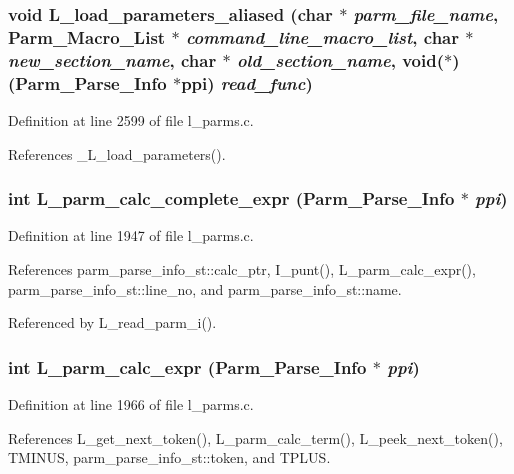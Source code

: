 \subsubsection{\setlength{\rightskip}{0pt plus 5cm}void L\_\-load\_\-parameters\_\-aliased (char $\ast$ {\em parm\_\-file\_\-name}, \bf{Parm\_\-Macro\_\-List} $\ast$ {\em command\_\-line\_\-macro\_\-list}, char $\ast$ {\em new\_\-section\_\-name}, char $\ast$ {\em old\_\-section\_\-name}, void($\ast$)(\bf{Parm\_\-Parse\_\-Info} $\ast$ppi) {\em read\_\-func})}\label{l__parms_8c_bcb88cfb83d54c9c10936af2ca0c6155}




Definition at line 2599 of file l\_\-parms.c.

References \_\-L\_\-load\_\-parameters().
\subsubsection{\setlength{\rightskip}{0pt plus 5cm}int L\_\-parm\_\-calc\_\-complete\_\-expr (\bf{Parm\_\-Parse\_\-Info} $\ast$ {\em ppi})}\label{l__parms_8c_62df370fac8e8f6cd66971ce843bab9c}




Definition at line 1947 of file l\_\-parms.c.

References parm\_\-parse\_\-info\_\-st::calc\_\-ptr, I\_\-punt(), L\_\-parm\_\-calc\_\-expr(), parm\_\-parse\_\-info\_\-st::line\_\-no, and parm\_\-parse\_\-info\_\-st::name.

Referenced by L\_\-read\_\-parm\_\-i().
\subsubsection{\setlength{\rightskip}{0pt plus 5cm}int L\_\-parm\_\-calc\_\-expr (\bf{Parm\_\-Parse\_\-Info} $\ast$ {\em ppi})}\label{l__parms_8c_649df4f104c79430336518dfcb1ae25b}




Definition at line 1966 of file l\_\-parms.c.

References L\_\-get\_\-next\_\-token(), L\_\-parm\_\-calc\_\-term(), L\_\-peek\_\-next\_\-token(), TMINUS, parm\_\-parse\_\-info\_\-st::token, and TPLUS.

